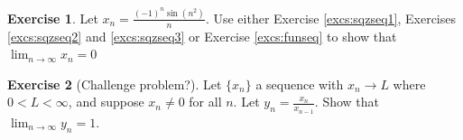 \documentclass[english]{book}
\newtheorem{corollary}[theorem]{Corollary}
\theoremstyle{remark}
\theoremstyle{definition}
\newtheorem{excs}{Exercise}[chapter]
\newtheorem{definition}[theorem]{Definition}
\newtheorem*{next week}{Next Week}
\newcommand{\dlim}{\displaystyle\lim}
\begin{document}
\begin{excs}
	Let $x_n= \frac{(-1)^n\sin(n^2)}{n}$. Use either Exercise \ref{excs:sqzseq1}, Exercises \ref{excs:sqzseq2} and \ref{excs:sqzseq3} or Exercise \ref{excs:funseq} to show that $\dlim_{n\to \infty}x_n=0$
\end{excs}

\begin{excs}[Challenge problem?]
	Let $\{x_n\}$ a sequence with $x_n\to L$ where $0<L<\infty$, and suppose $x_n\neq 0$ for all $n$. Let $y_n=\frac{x_n}{x_{n-1}}$. Show that $\dlim_{n\to \infty}y_n=1$. 
\end{excs}
\end{document}
